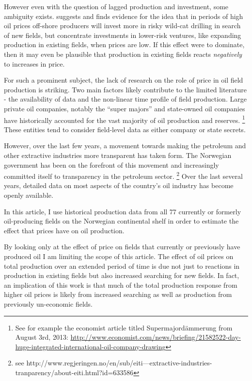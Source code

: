 \documentclass[12pt]{article}
\begin{document}
However even with the question of lagged production and investment, some ambiguity exists.  \citet{mohn_efforts_2008} suggests and finds evidence for the idea that in periods of high oil prices off-shore producers will invest more in risky wild-cat drilling in search of new fields, but concentrate investments in lower-risk ventures, like expanding production in existing fields, when prices are low.  If this effect were to dominate, then it may even be plausible that production in existing fields reacts \emph{negatively} to increases in price. 


For such a prominent subject, the lack of research on the role of price in oil field production is striking. Two main factors likely contribute to the limited literature - the availability of data and the non-linear time profile of field production.  Large private oil companies, notably the “super majors” and state-owned oil companies have historically accounted for the vast majority of oil production and reserves. \footnote{See for example the economist article titled Supermajordämmerung from August 3rd, 2013: \url{http://www.economist.com/news/briefing/21582522-day-huge-integrated-international-oil-company-drawing}} These entities tend to consider field-level data as either company or state secrets.   

However, over the last few years, a movement towards making the petroleum and other extractive industries more transparent has taken form.  The Norwegian government has been on the forefront of this movement and increasingly committed itself to transparency in the petroleum sector. \footnote{see http://www.regjeringen.no/en/sub/eiti---extractive-industries-tranparency/about-eiti.html?id=633586} Over the last several years, detailed data on most aspects of the country’s oil industry has become openly available.  

In this article, I use historical production data from all 77 currently or formerly oil-producing fields on the Norwegian continental shelf in order to estimate the effect that prices have on oil production.  

By looking only at the effect of price on fields that currently or previously have produced oil I am limiting the scope of this article.  The effect of oil prices on total production over an extended period of time is due not just to reactions in production in existing fields but also increased searching for new fields.  In fact, an implication of this work is that much of the total production response from higher oil prices is likely from increased searching as well as production from previously un-economic fields.
\end{document}
